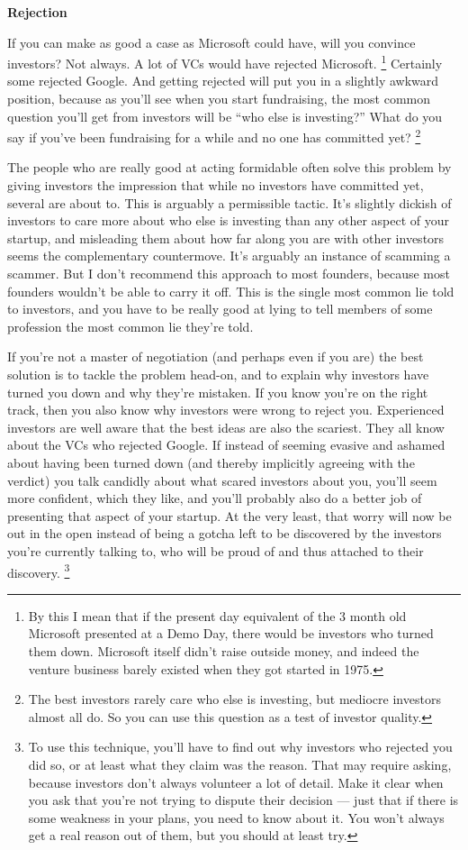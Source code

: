 \textbf{Rejection}

If you can make as good a case as Microsoft could have, will you
convince investors? Not always. A lot of VCs would have rejected
Microsoft. \footnote{By this I mean that if the present day equivalent of the 3 month
old Microsoft presented at a Demo Day, there would be investors who
turned them down. Microsoft itself didn't raise outside money, and
indeed the venture business barely existed when they got started in
1975.} Certainly some rejected Google. And
getting rejected will put you in a slightly awkward position, because as
you'll see when you start fundraising, the most common question you'll
get from investors will be ``who else is investing?'' What do you say if
you've been fundraising for a while and no one has committed yet?
\footnote{The best investors rarely care who else is investing, but
mediocre investors almost all do. So you can use this question as a test
of investor quality.}

The people who are really good at acting formidable often solve this
problem by giving investors the impression that while no investors have
committed yet, several are about to. This is arguably a permissible
tactic. It's slightly dickish of investors to care more about who else
is investing than any other aspect of your startup, and misleading them
about how far along you are with other investors seems the complementary
countermove. It's arguably an instance of scamming a scammer. But I
don't recommend this approach to most founders, because most founders
wouldn't be able to carry it off. This is the single most common lie
told to investors, and you have to be really good at lying to tell
members of some profession the most common lie they're told.

If you're not a master of negotiation (and perhaps even if you are) the
best solution is to tackle the problem head-on, and to explain why
investors have turned you down and why they're mistaken. If you know
you're on the right track, then you also know why investors were wrong
to reject you. Experienced investors are well aware that the best ideas
are also the scariest. They all know about the VCs who rejected Google.
If instead of seeming evasive and ashamed about having been turned down
(and thereby implicitly agreeing with the verdict) you talk candidly
about what scared investors about you, you'll seem more confident, which
they like, and you'll probably also do a better job of presenting that
aspect of your startup. At the very least, that worry will now be out in
the open instead of being a gotcha left to be discovered by the
investors you're currently talking to, who will be proud of and thus
attached to their discovery. \footnote{To use this technique, you'll have to find out why investors
who rejected you did so, or at least what they claim was the reason.
That may require asking, because investors don't always volunteer a lot
of detail. Make it clear when you ask that you're not trying to dispute
their decision --- just that if there is some weakness in your plans,
you need to know about it. You won't always get a real reason out of
them, but you should at least try.}

